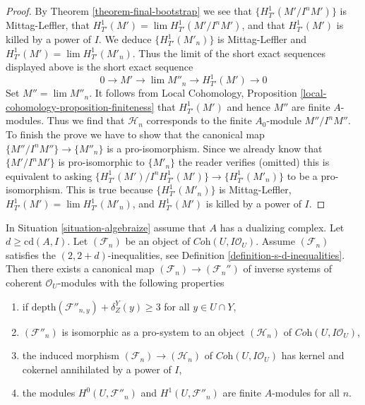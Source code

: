 \begin{proof}
\medskip\noindent
By Theorem \ref{theorem-final-bootstrap} we see that $\{H^1_{T'}(M'/I^nM')\}$
is Mittag-Leffler, that $H^1_{T'}(M') = \lim H^1_{T'}(M'/I^nM')$, and that
$H^1_{T'}(M')$ is killed by a power of $I$. We deduce
$\{H^1_{T'}(M'_n)\}$ is Mittag-Leffler and $H^1_{T'}(M') = \lim H^1_{T'}(M'_n)$.
Thus the limit of the short exact sequences displayed above
is the short exact sequence
$$
0 \to M' \to \lim M''_n \to H^1_{T'}(M') \to 0
$$
Set $M'' = \lim M''_n$. It follows from
Local Cohomology, Proposition \ref{local-cohomology-proposition-finiteness}
that $H^1_{T'}(M')$
and hence $M''$ are finite $A$-modules.
Thus we find that $\mathcal{H}_n$ corresponds to
the finite $A_0$-module $M''/I^nM''$. To finish the prove we have to show
that the canonical map $\{M''/I^nM''\} \to \{M''_n\}$ is a pro-isomorphism.
Since we already know that $\{M'/I^nM'\}$ is pro-isomorphic to
$\{M'_n\}$ the reader verifies (omitted) this is equivalent to asking
$\{H^1_{T'}(M')/I^nH^1_{T'}(M')\} \to \{H^1_{T'}(M'_n)\}$
to be a pro-isomorphism. This is true because $\{H^1_{T'}(M'_n)\}$
is Mittag-Leffler, $H^1_{T'}(M') = \lim H^1_{T'}(M'_n)$, and
$H^1_{T'}(M')$ is killed by a power of $I$.
\end{proof}

\begin{lemma}
\label{lemma-improvement-application}
In Situation \ref{situation-algebraize} assume that $A$ has
a dualizing complex. Let $d \geq \text{cd}(A, I)$. Let $(\mathcal{F}_n)$
be an object of $\textit{Coh}(U, I\mathcal{O}_U)$. Assume
$(\mathcal{F}_n)$ satisfies the $(2, 2 + d)$-inequalities, see
Definition \ref{definition-s-d-inequalities}.
Then there exists a canonical map $(\mathcal{F}_n) \to (\mathcal{F}_n'')$
of inverse systems of coherent $\mathcal{O}_U$-modules
with the following properties
\begin{enumerate}
\item if $\text{depth}(\mathcal{F}''_{n, y}) + \delta^Y_Z(y) \geq 3$
for all $y \in U \cap Y$,
\item $(\mathcal{F}''_n)$ is isomorphic as a pro-system to an object
$(\mathcal{H}_n)$ of $\textit{Coh}(U, I\mathcal{O}_U)$,
\item the induced morphism $(\mathcal{F}_n) \to (\mathcal{H}_n)$ of
$\textit{Coh}(U, I\mathcal{O}_U)$ has kernel and cokernel
annihilated by a power of $I$,
\item the modules $H^0(U, \mathcal{F}''_n)$ and $H^1(U, \mathcal{F}''_n)$
are finite $A$-modules for all $n$.
\end{enumerate}
\end{lemma}

